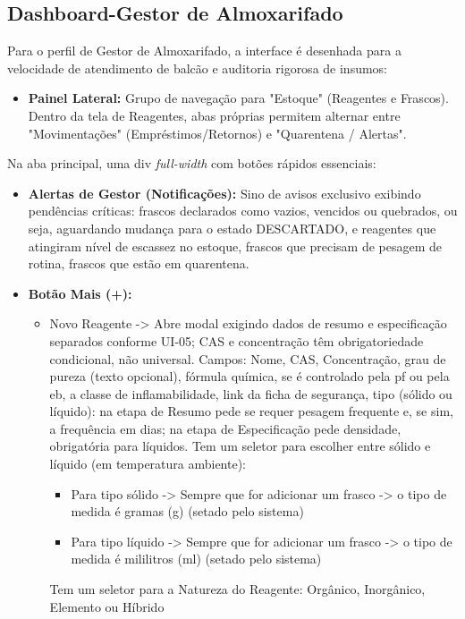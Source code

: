 \subsection{Dashboard-Gestor de Almoxarifado}
Para o perfil de Gestor de Almoxarifado, a interface é desenhada para a velocidade de atendimento de balcão e auditoria rigorosa de insumos:
\begin{itemize}
    \item \textbf{Painel Lateral:} Grupo de navegação para "Estoque" (Reagentes e Frascos). Dentro da tela de Reagentes, abas próprias permitem alternar entre "Movimentações" (Empréstimos/Retornos) e "Quarentena / Alertas".
\end{itemize}

Na aba principal, uma div \textit{full-width} com botões rápidos essenciais:
\begin{itemize}
    \item \textbf{Alertas de Gestor (Notificações):} Sino de avisos exclusivo exibindo pendências críticas: frascos declarados como vazios, vencidos ou quebrados, ou seja, aguardando mudança para o estado DESCARTADO, e reagentes que atingiram nível de escassez no estoque, frascos que precisam de pesagem de rotina, frascos que estão em quarentena.
    \item \textbf{Botão Mais (+):}
    \begin{itemize}
        \item Novo Reagente -> Abre modal exigindo dados de resumo e especificação separados conforme UI-05; CAS e concentração têm obrigatoriedade condicional, não universal. Campos: Nome, CAS, Concentração, grau de pureza (texto opcional), fórmula química, se é controlado pela pf ou pela eb, a classe de inflamabilidade, link da ficha de segurança, tipo (sólido ou líquido): na etapa de Resumo pede se requer pesagem frequente e, se sim, a frequência em dias; na etapa de Especificação pede densidade, obrigatória para líquidos.
        Tem um seletor para escolher entre sólido e líquido (em temperatura ambiente):
        \begin{itemize}
            \item Para tipo sólido -> Sempre que for adicionar um frasco -> o tipo de medida é gramas (g) (setado pelo sistema)
            \item Para tipo líquido -> Sempre que for adicionar um frasco -> o tipo de medida é mililitros (ml) (setado pelo sistema)
        \end{itemize}
        Tem um seletor para a Natureza do Reagente: Orgânico, Inorgânico, Elemento ou Híbrido


\end{itemize}
\end{itemize}
